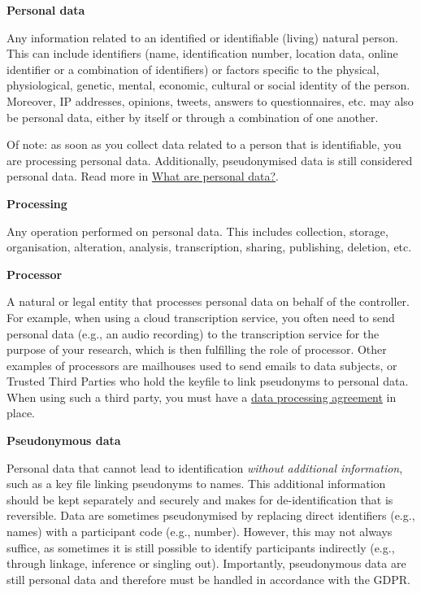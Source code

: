 \documentclass[
]{book}
\begin{document}
\textbf{Personal data}

Any information related to an identified or identifiable (living) natural person. This can include identifiers (name, identification number, location data, online identifier or a combination of identifiers) or factors specific to the physical, physiological, genetic, mental, economic, cultural or social identity of the person. Moreover, IP addresses, opinions, tweets, answers to questionnaires, etc. may also be personal data, either by itself or through a combination of one another.

Of note: as soon as you collect data related to a person that is identifiable, you are processing personal data. Additionally, pseudonymised data is still considered personal data. Read more in \protect\hyperlink{personal-data}{What are personal data?}.

\textbf{Processing}

Any operation performed on personal data. This includes collection, storage, organisation, alteration, analysis, transcription, sharing, publishing, deletion, etc.

\textbf{Processor}

A natural or legal entity that processes personal data on behalf of the controller. For example, when using a cloud transcription service, you often need to send personal data (e.g., an audio recording) to the transcription service for the purpose of your research, which is then fulfilling the role of processor. Other examples of processors are mailhouses used to send emails to data subjects, or Trusted Third Parties who hold the keyfile to link pseudonyms to personal data. When using such a third party, you must have a \protect\hyperlink{data-processing-agreement}{data processing agreement} in place.

\textbf{Pseudonymous data}

Personal data that cannot lead to identification \emph{without additional information}, such as a key file linking pseudonyms to names. This additional information should be kept separately and securely and makes for de-identification that is reversible. Data are sometimes pseudonymised by replacing direct identifiers (e.g., names) with a participant code (e.g., number). However, this may not always suffice, as sometimes it is still possible to identify participants indirectly (e.g., through linkage, inference or singling out). Importantly, pseudonymous data are still personal data and therefore must be handled in accordance with the GDPR.
\end{document}
